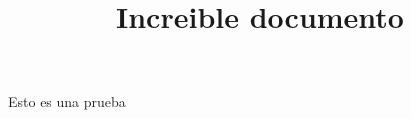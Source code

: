 \documentclass{article}
\title{Increible documento}
\begin{document}
Esto es una prueba
\end{document}
